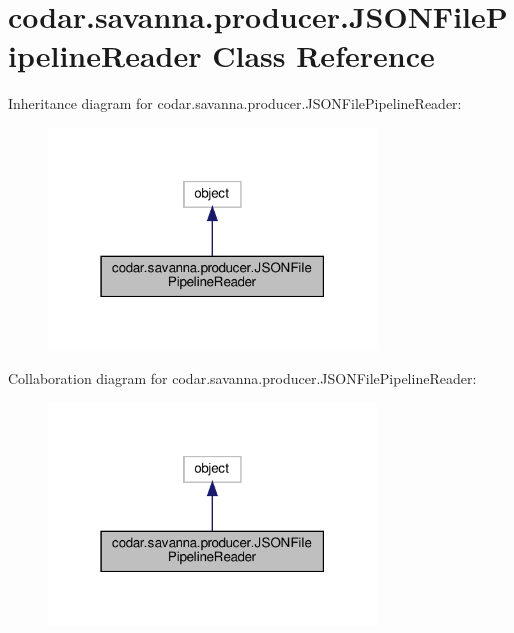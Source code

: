 \hypertarget{classcodar_1_1savanna_1_1producer_1_1_j_s_o_n_file_pipeline_reader}{}\section{codar.\+savanna.\+producer.\+J\+S\+O\+N\+File\+Pipeline\+Reader Class Reference}
\label{classcodar_1_1savanna_1_1producer_1_1_j_s_o_n_file_pipeline_reader}


Inheritance diagram for codar.\+savanna.\+producer.\+J\+S\+O\+N\+File\+Pipeline\+Reader\+:
\nopagebreak
\begin{figure}[H]
\begin{center}
\leavevmode
\includegraphics[width=247pt]{classcodar_1_1savanna_1_1producer_1_1_j_s_o_n_file_pipeline_reader__inherit__graph}
\end{center}
\end{figure}


Collaboration diagram for codar.\+savanna.\+producer.\+J\+S\+O\+N\+File\+Pipeline\+Reader\+:
\nopagebreak
\begin{figure}[H]
\begin{center}
\leavevmode
\includegraphics[width=247pt]{classcodar_1_1savanna_1_1producer_1_1_j_s_o_n_file_pipeline_reader__coll__graph}
\end{center}
\end{figure}
